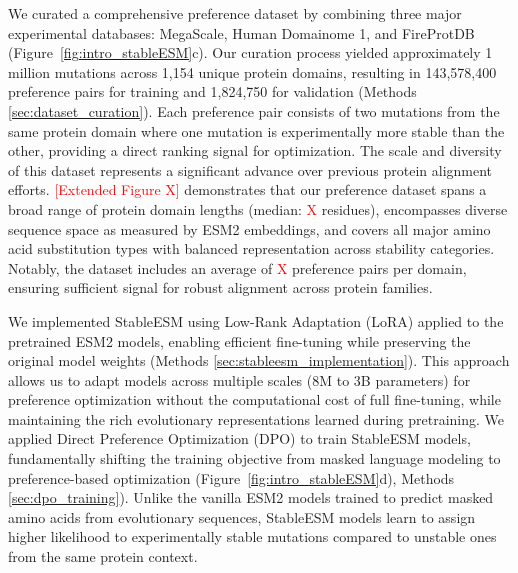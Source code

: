 \documentclass[]{fairmeta}
\begin{document}
We curated a comprehensive preference dataset by combining three major experimental databases: MegaScale, Human Domainome 1, and FireProtDB (Figure~\ref{fig:intro_stableESM}c). Our curation process yielded approximately 1 million mutations across 1,154 unique protein domains, resulting in 143,578,400 preference pairs for training and 1,824,750 for validation (Methods \ref{sec:dataset_curation}). Each preference pair consists of two mutations from the same protein domain where one mutation is experimentally more stable than the other, providing a direct ranking signal for optimization.
The scale and diversity of this dataset represents a significant advance over previous protein alignment efforts. \textcolor{red}{[Extended Figure X]} demonstrates that our preference dataset spans a broad range of protein domain lengths (median: \textcolor{red}{X} residues), encompasses diverse sequence space as measured by ESM2 embeddings, and covers all major amino acid substitution types with balanced representation across stability categories. Notably, the dataset includes an average of \textcolor{red}{X} preference pairs per domain, ensuring sufficient signal for robust alignment across protein families.

We implemented StableESM using Low-Rank Adaptation (LoRA) applied to the pretrained ESM2 models, enabling efficient fine-tuning while preserving the original model weights (Methods \ref{sec:stableesm_implementation}). This approach allows us to adapt models across multiple scales (8M to 3B parameters) for preference optimization without the computational cost of full fine-tuning, while maintaining the rich evolutionary representations learned during pretraining. We applied Direct Preference Optimization (DPO) to train StableESM models, fundamentally shifting the training objective from masked language modeling to preference-based optimization (Figure~\ref{fig:intro_stableESM}d), Methods \ref{sec:dpo_training}). Unlike the vanilla ESM2 models trained to predict masked amino acids from evolutionary sequences, StableESM models learn to assign higher likelihood to experimentally stable mutations compared to unstable ones from the same protein context.
\end{document}
